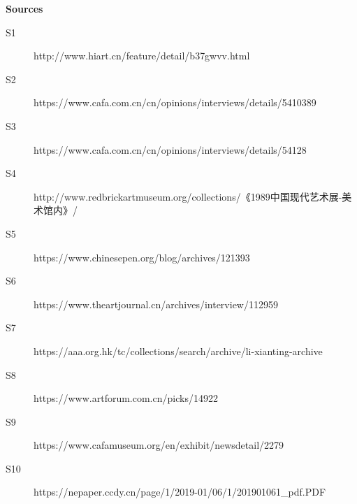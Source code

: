 \noindent\textbf{Sources}
\begin{description}
\item [S1] http://www.hiart.cn/feature/detail/b37gwvv.html
\item [S2] https://www.cafa.com.cn/cn/opinions/interviews/details/5410389
\item [S3] https://www.cafa.com.cn/cn/opinions/interviews/details/54128
\item [S4] http://www.redbrickartmuseum.org/collections/《1989中国现代艺术展-美术馆内》/
\item [S5] https://www.chinesepen.org/blog/archives/121393
\item [S6] https://www.theartjournal.cn/archives/interview/112959
\item [S7] https://aaa.org.hk/tc/collections/search/archive/li-xianting-archive
\item [S8] https://www.artforum.com.cn/picks/14922
\item [S9] https://www.cafamuseum.org/en/exhibit/newsdetail/2279
\item [S10] https://nepaper.ccdy.cn/page/1/2019-01/06/1/201901061\_pdf.PDF
\end{description}

